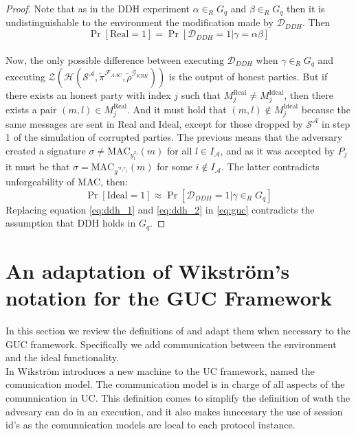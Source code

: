 \documentclass{acm_proc_article-sp}
\begin{document}
\begin{proof}
Note that as in the DDH experiment $\alpha \in_{R} G_q$ and $\beta \in_{R} G_q$ then it is undistinguishable to the
environment the modification made by $\mathcal{D}_{DDH}$. Then
\begin{equation}
\Pr[\mathrm{Real} = 1] = \Pr[\mathcal{D}_{DDH} = 1|\gamma = \alpha\beta]
\label{eq:ddh_1}
\end{equation}\\
Now, the only possible difference between executing $\mathcal{D}_{DDH}$ when $\gamma \in_R G_q$ and executing
$
\mathcal{Z}(
    \mathcal{H}(
        \mathcal{S^A},
        \tilde{\pi}^{\mathcal{F}_{AAC}},
        \tilde{\rho}^{\bar{\mathcal{G}}_{KRK}}))
$
is the output of honest parties. But if there exists an honest party with index $j$ such that $M_j^\mathrm{Real} \neq M_j^\mathrm{Ideal}$,
then there exists a pair $(m, l) \in M_j^\mathrm{Real}$. And it must hold that $(m, l) \notin M_j^\mathrm{Ideal}$ because the
same messages are sent in Real and Ideal, except for those dropped by $\mathcal{S^A}$ in step 1 of the simulation of corrupted
parties. The previous means that the adversary created a signature $\sigma \neq \mathrm{MAC}_{y_i^{x_l}}(m)$ for all $l \in I_\mathcal{A}$,
and as it was accepted by $P_j$ it must be that $\sigma = \mathrm{MAC}_{g^{\gamma r_i r_j}}(m)$ for some $i \notin I_\mathcal{A}$.
The latter contradicts unforgeability of MAC, then:
\begin{equation}
\Pr[\mathrm{Ideal} = 1] \approx \Pr[\mathcal{D}_{DDH} = 1|\gamma \in_R G_q]
\label{eq:ddh_2}
\end{equation}
Replacing equation \ref{eq:ddh_1} and \ref{eq:ddh_2} in \ref{eq:guc} contradicts the assumption that DDH holds in $G_q$.
\end{proof}

%

%
%
\appendix
\section{An adaptation of Wikstr\"om's notation for the GUC Framework}
In this section we review the definitions of \cite{mnCompleto} and adapt them
when necessary to the GUC framework. Specifically we add communication between the
environment and the ideal functionality. \\
In \cite{mnCompleto} Wikstr\"om introduces a new machine to the UC framework, named
the comunication model. The communication model is in charge of all aspects of the
comunnication in UC. This definition comes to simplify the definition of wath the
advesary can do in an execution, and it also makes innecesary the use of session id's
as the comunnication models are local to each protocol instance.
\end{document}
